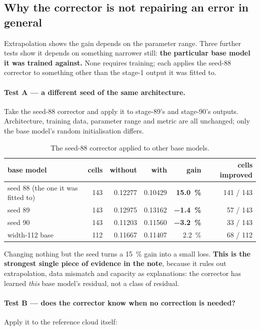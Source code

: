 ﻿\documentclass[11pt,a4paper]{article}
\begin{document}
\subsection{Why the corrector is not repairing an error in general}

Extrapolation shows the gain depends on the parameter range. Three further tests show it depends on
something narrower still: \textbf{the particular base model it was trained against.} None requires
training; each applies the seed-88 corrector to something other than the stage-1 output it was fitted
to.

\paragraph{Test A --- a different seed of the same architecture.} Take the seed-88 corrector and apply
it to stage-89's and stage-90's outputs. Architecture, training data, parameter range and metric are
all unchanged; only the base model's random initialisation differs.

\begin{table}[h]
\centering\small
\begin{tabular}{@{}lrrrrr@{}}
\toprule
base model & cells & without & with & gain & cells improved \\
\midrule
seed 88 (the one it was fitted to) & 143 & 0.12277 & 0.10429 & \textbf{\SI{15.0}{\percent}} &
  141 / 143 \\
seed 89 & 143 & 0.12975 & 0.13162 & \textbf{\SI{-1.4}{\percent}} & 57 / 143 \\
seed 90 & 143 & 0.11203 & 0.11560 & \textbf{\SI{-3.2}{\percent}} & 33 / 143 \\
width-112 base & 112 & 0.11667 & 0.11407 & \SI{2.2}{\percent} & 68 / 112 \\
\bottomrule
\end{tabular}
\caption{The seed-88 corrector applied to other base models.}
\end{table}

Changing nothing but the seed turns a \SI{15}{\percent} gain into a small loss. \textbf{This is the
strongest single piece of evidence in the note}, because it rules out extrapolation, data mismatch
and capacity as explanations: the corrector has learned \emph{this} base model's residual, not a
class of residual.

\paragraph{Test B --- does the corrector know when no correction is needed?} Apply it to the
reference cloud itself:
\end{document}

